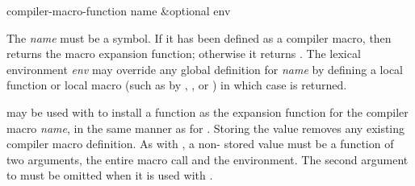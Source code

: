 \begin{defun}[Function]
compiler-macro-function name &optional env

  The \emph{name} must be a symbol.
  If it has been defined as a compiler macro, then
   returns the macro expansion
  function; otherwise it returns .  The
  lexical environment \emph{env} may override any global definition for \emph{name}
  by defining a local function or local macro (such as by , , or
  ) in which case  is returned.

   may be used with  to install a function as
  the expansion function for the compiler macro \emph{name}, in the same manner as for
  .  Storing the value  removes any existing
  compiler macro definition.  As with , a non- stored value
  must be a function of two arguments, the entire macro call and 
  the environment.  The second argument to  must
  be omitted when it is used with .
\end{defun}

